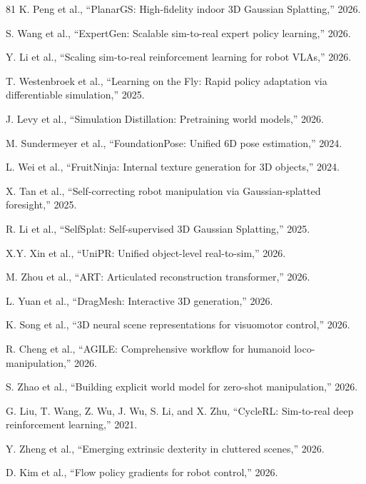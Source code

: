\documentclass[journal]{IEEEtran}
\begin{document}
\begin{thebibliography}{81}
 K. Peng et al., ``PlanarGS: High-fidelity indoor 3D Gaussian Splatting,'' 2026.

 S. Wang et al., ``ExpertGen: Scalable sim-to-real expert policy learning,'' 2026.

 Y. Li et al., ``Scaling sim-to-real reinforcement learning for robot VLAs,'' 2026.

 T. Westenbroek et al., ``Learning on the Fly: Rapid policy adaptation via differentiable simulation,'' 2025.

 J. Levy et al., ``Simulation Distillation: Pretraining world models,'' 2026.

 M. Sundermeyer et al., ``FoundationPose: Unified 6D pose estimation,'' 2024.

 L. Wei et al., ``FruitNinja: Internal texture generation for 3D objects,'' 2024.

 X. Tan et al., ``Self-correcting robot manipulation via Gaussian-splatted foresight,'' 2025.

 R. Li et al., ``SelfSplat: Self-supervised 3D Gaussian Splatting,'' 2025.

 X.Y. Xin et al., ``UniPR: Unified object-level real-to-sim,'' 2026.

 M. Zhou et al., ``ART: Articulated reconstruction transformer,'' 2026.

 L. Yuan et al., ``DragMesh: Interactive 3D generation,'' 2026.

 K. Song et al., ``3D neural scene representations for visuomotor control,'' 2026.

 R. Cheng et al., ``AGILE: Comprehensive workflow for humanoid loco-manipulation,'' 2026.

 S. Zhao et al., ``Building explicit world model for zero-shot manipulation,'' 2026.

 G. Liu, T. Wang, Z. Wu, J. Wu, S. Li, and X. Zhu, ``CycleRL: Sim-to-real deep reinforcement learning,'' 2021.

 Y. Zheng et al., ``Emerging extrinsic dexterity in cluttered scenes,'' 2026.

 D. Kim et al., ``Flow policy gradients for robot control,'' 2026.


\end{thebibliography}
\end{document}
